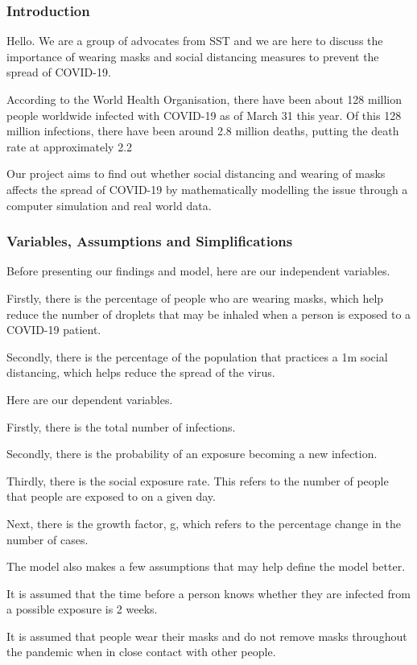 \documentclass[a4paper,titlepage]{article}
\begin{document}
\subsubsection{Introduction}

Hello. We are a group of advocates from SST and we are here to discuss the importance of wearing masks and social distancing measures to prevent the spread of COVID-19.

According to the World Health Organisation, there have been about 128 million people worldwide infected with COVID-19 as of March 31 this year. Of this 128 million infections, there have been around 2.8 million deaths, putting the death rate at approximately 2.2%

Our project aims to find out whether social distancing and wearing of masks affects the spread of COVID-19 by mathematically modelling the issue through a computer simulation and real world data.

\subsubsection{Variables, Assumptions and Simplifications}
Before presenting our findings and model, here are our independent variables.

Firstly, there is the percentage of people who are wearing masks, which help reduce the number of droplets that may be inhaled when a person is exposed to a COVID-19 patient. 

Secondly, there is the percentage of the population that practices a 1m social distancing, which helps reduce the spread of the virus.

Here are our dependent variables.

Firstly, there is the total number of infections.

Secondly, there is the probability of an exposure becoming a new infection. 

Thirdly, there is the social exposure rate. This refers to the number of people that people are exposed to on a given day.

Next, there is the growth factor, g, which refers to the percentage change in the number of cases. 

The model also makes a few assumptions that may help define the model better.

It is assumed that the time before a person knows whether they are infected from a possible exposure is 2 weeks.

It is assumed that people wear their masks and do not remove masks throughout the pandemic when in close contact with other people.
\end{document}
